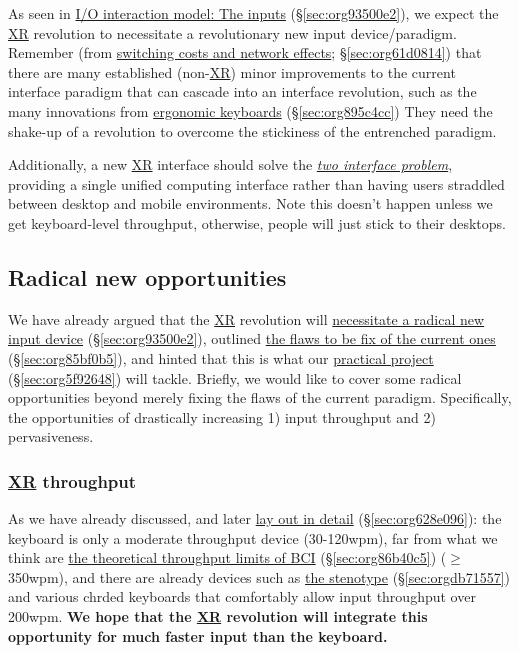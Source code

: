 \documentclass[logo,bsc,singlespacing,parskip]{infthesis}
\begin{document}
As seen in \hyperref[sec:org93500e2]{I/O interaction model: The inputs} (\S \ref{sec:org93500e2}), we expect the \hyperref[org39cbd51]{XR} revolution to necessitate a revolutionary new input device/paradigm.
Remember (from \hyperref[sec:org61d0814]{switching costs and network effects}; \S \ref{sec:org61d0814}) that there are many established (non-\hyperref[org39cbd51]{XR}) minor improvements to the current interface paradigm that
can cascade into an interface revolution, such as the many innovations from \hyperref[sec:org895c4cc]{ergonomic keyboards} (\S \ref{sec:org895c4cc})
They need the shake-up of a revolution to overcome the stickiness of the entrenched paradigm.

Additionally, a new \hyperref[org39cbd51]{XR} interface should solve the \emph{\hyperref[two interface problem]{two interface problem}}, providing a single unified computing interface rather than having users straddled between desktop and mobile environments.
Note this doesn't happen unless we get keyboard-level throughput, otherwise, people will just stick to their desktops.

\subsection{Radical new opportunities}
\label{sec:org23d9ecb}
We have already argued that the \hyperref[org39cbd51]{XR} revolution will \hyperref[sec:org93500e2]{necessitate a radical new input device} (\S \ref{sec:org93500e2}), outlined \hyperref[sec:org85bf0b5]{the flaws to be fix of the current ones} (\S \ref{sec:org85bf0b5}), and hinted that this is what our \hyperref[sec:org5f92648]{practical project} (\S \ref{sec:org5f92648}) will tackle.
Briefly, we would like to cover some radical opportunities beyond merely fixing the flaws of the current paradigm.
Specifically, the opportunities of drastically increasing 1) input throughput and 2) pervasiveness.

\subsubsection{\hyperref[org39cbd51]{XR} throughput}
\label{sec:orgeaf3584}
As we have already discussed, and later \hyperref[sec:org628e096]{lay out in detail} (\S \ref{sec:org628e096}): the keyboard is only a moderate throughput device (30-120wpm), far from what we think are \hyperref[sec:org86b40c5]{the theoretical throughput limits of BCI} (\S \ref{sec:org86b40c5}) (\(\ge\)350wpm), and there are already devices such as \hyperref[sec:orgdb71557]{the stenotype} (\S \ref{sec:orgdb71557}) and various chrded keyboards  that comfortably allow input throughput over 200wpm.
\textbf{We hope that the \hyperref[org39cbd51]{XR} revolution will integrate this opportunity for much faster input than the keyboard.}
\end{document}
